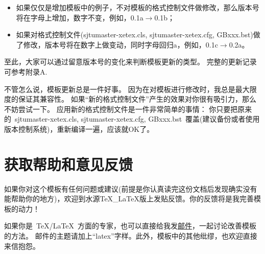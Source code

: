 \begin{itemize}
\item 如果仅仅是增加模板中的例子，不对模板的格式控制文件做修改，那么版本号将在字母上增加，数字不变，例如，0.1a$\rightarrow$0.1b；
\item 如果对格式控制文件(sjtumaster-xetex.cls, sjtumaster-xetex.cfg, GBxxx.bst)做了修改，版本号将在数字上做变动，同时字母回归a，例如，0.1c$\rightarrow$0.2a。
\end{itemize}

至此，大家可以通过留意版本号的变化来判断模板更新的类型。
完整的更新记录可参考附录A.

不管怎么说，模板更新总是一件好事。
因为在对模板进行修改时，我总是最大限度的保证其兼容性。
如果``新的格式控制文件''产生的效果对你很有吸引力，那么不妨尝试一下。
应用新的格式控制文件是一件非常简单的事情：
你只要把原来的~sjtumaster-xetex.cls, sjtumaster-xetex.cfg, GBxxx.bst~覆盖(建议备份或者使用版本控制系统)，重新编译一遍，应该就OK了。


\section{获取帮助和意见反馈}
\label{sec:replay}

如果你对这个模板有任何问题或建议(前提是你认真读完这份文档后发现确实没有能帮助你的地方)，欢迎到水源TeX\_LaTeX版上发贴反馈。你的反馈将是我完善模板的动力！

如果你是~\TeX/\LaTeX~方面的专家，也可以直接给我发\href{mailto:wei.jianwen@gmail.com}{邮件}，一起讨论改善模板的方法。
邮件的主题请加上``latex''字样。此外，模板中的其他纰缪，也欢迎直接来信抱怨。
